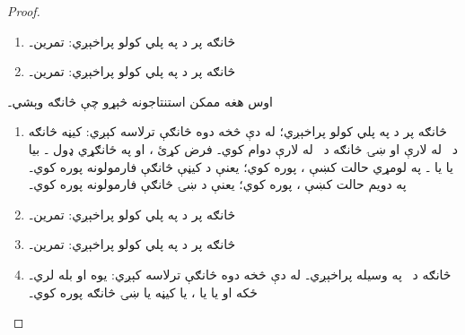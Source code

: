 \documentclass[12pt,a4paper,oneside]{report}
\theoremstyle{definition}
\begin{document}
\begin{proof}
\begin{enumerate}
\label{olpseg:OLP-0109-B018:start}
د \emph{امتدادي والي قضيه}\nobreakspace{} له مخې\newline
  ۔ د \emph{فورمول د بدلولو قضيه}\nobreakspace{} له مخې
  ۔ ځکه  يوه تړلے فارمول ده، د
  \emph{جملې د صدق او متغير-ګومارنې قضيه}\nobreakspace{} له مخې
  ؛ يعنې ،
   پوره کوي۔
\item څانګه پر \LR{$\sFmla{\True}{\lexists[x][!B(x)]} \in \Gamma$} د
  \LR{$\TRule{\True}{\lexists}$} په پلي کولو پراخېږي: تمرين۔
\item څانګه پر \LR{$\sFmla{\False}{\lexists[x][!B(x)]} \in \Gamma$} د
  \LR{$\TRule{\False}{\lexists}$} په پلي کولو پراخېږي: تمرين۔
\end{enumerate}
اوس هغه ممکن استنتاجونه څېړو چې څانګه وېشي۔
\begin{enumerate}
\item څانګه پر  د
  \LR{$\TRule{\False}{\land}$} په پلي کولو پراخېږي؛ له دې څخه دوه څانګې
  ترلاسه کېږي: کيڼه څانګه د~ له لارې او ښۍ
  څانګه د~ له لارې دوام کوي۔ فرض کړئ
  ، او په ځانګړي ډول
  ۔ بيا يا
   يا
  ۔ په لومړي حالت کښې
  ،
   پوره کوي؛ يعنې
   د کيڼې څانګې فارمولونه
  پوره کوي۔ په دويم حالت کښې
  ،
   پوره کوي؛ يعنې
   د ښۍ څانګې فارمولونه
  پوره کوي۔
\item څانګه پر  د
  \LR{$\TRule{\True}{\lor}$} په پلي کولو پراخېږي: تمرين۔
\item څانګه پر  د
  \LR{$\TRule{\True}{\lif}$} په پلي کولو پراخېږي: تمرين۔
\item څانګه د~\Cut{} په وسيله پراخېږي۔ له دې څخه دوه څانګې ترلاسه
  کېږي: يوه  او بله  لري۔
  ځکه  او يا
   يا
  ،
   يا کيڼه يا ښۍ څانګه پوره
  کوي۔
\end{enumerate}
\end{proof}
\label{olpseg:OLP-0109-B018:end}
\end{document}
